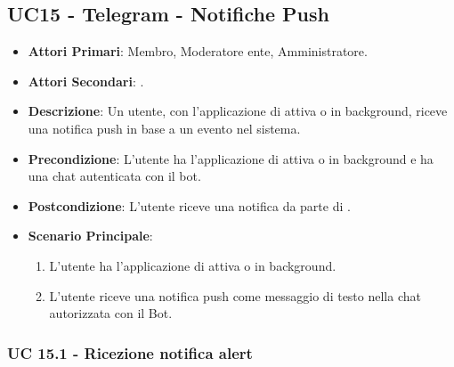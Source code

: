 \subsection{UC15 - Telegram - Notifiche Push}
		
		
	\begin{itemize}
		\item \textbf{Attori Primari}: Membro, Moderatore ente, Amministratore.
		\item \textbf{Attori Secondari}: .
		\item \textbf{Descrizione}: Un utente, con l'applicazione di  attiva o in background, riceve una notifica push in base a un evento nel sistema. 
		\item \textbf{Precondizione}: L'utente ha l'applicazione di  attiva o in background e ha una chat autenticata con il bot.
		\item \textbf{Postcondizione}: L'utente riceve una notifica da parte di .
		\item \textbf{Scenario Principale}:
		\begin{enumerate}
			\item L'utente ha l'applicazione di  attiva o in background. 
			\item L'utente riceve una notifica push come messaggio di testo nella chat autorizzata con il Bot.
		\end{enumerate}
	\end{itemize}
	
	\subsubsection{UC 15.1 - Ricezione notifica alert}

